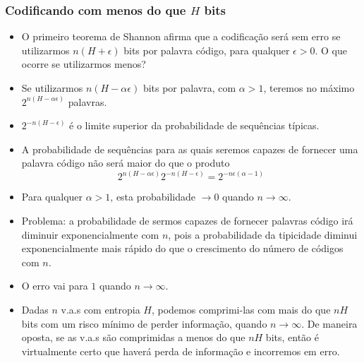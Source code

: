 \begin{frame}[allowframebreaks]
  \frametitle{Codificando com menos do que $H$ bits}
  \begin{itemize}
  \item O primeiro teorema de Shannon afirma que a codificação será sem erro se utilizarmos $n(H+\epsilon)$ bits 
        por palavra código, para qualquer $\epsilon > 0$. O que ocorre se utilizarmos menos?
  \item Se utilizarmos $n(H-\alpha \epsilon)$ bits por palavra, com $\alpha > 1$, teremos no máximo $2^{n(H-\alpha \epsilon)}$ palavras.
  \item $2^{-n(H-\epsilon)}$ é o limite superior da probabilidade de sequências típicas.
  \item A probabilidade de sequências para as quais seremos capazes de fornecer uma palavra código não será maior do que o produto
        \begin{equation}
        2^{n(H-\alpha \epsilon)} 2^{-n(H-\epsilon)} = 2^{-n\epsilon(\alpha - 1)}
        \end{equation}
  \item Para qualquer $\alpha > 1$, esta probabilidade $\rightarrow 0$ quando $n \rightarrow \infty$.
  \item Problema: a probabilidade de sermos capazes de fornecer palavras código irá diminuir exponencialmente com $n$, pois a 
        probabilidade da tipicidade diminui exponencialmente mais rápido do que o crescimento do número de códigos com $n$.
  \item O erro vai para $1$ quando $n \rightarrow \infty$.
  \item Dadas $n$ v.a.s com entropia $H$, podemos comprimi-las com mais do que $nH$ bits com um risco mínimo de perder informação, quando $n \rightarrow \infty$.
        De maneira oposta, se as v.a.s são comprimidas a menos do que $nH$ bits, então é virtualmente certo que haverá perda de informação e incorremos em erro.
  \end{itemize}

\end{frame}

